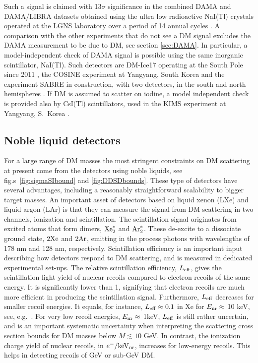 Such a signal is claimed with 13$\sigma$ significance in the combined DAMA and DAMA/LIBRA datasets obtained using the ultra low radioactive NaI(Tl) crystals operated at the LGNS laboratory over a period of 14 annual cycles \cite{DAMA,DAMA/LIBRA}. A comparison with the other experiments that do not see a DM signal excludes the DAMA measurement to be due to DM, see section \ref{sec:DAMA}.
In particular, a model-independent check of DAMA signal is possible using the same inorganic scintillator, NaI(Tl). Such detectors are DM-Ice17 operating at  the South Pole since 2011 \cite{1602.05939}, the COSINE experiment at Yangyang, South Korea  and the experiment SABRE in construction, with two detectors, in the south and north hemispheres \cite{SABRE}.
If DM is assumed to scatter on iodine, a model independent check is provided also by CsI(Tl) scintillators,  used in the KIMS experiment at Yangyang, S.\ Korea  \cite{KIMS}.


\subsection{Noble liquid detectors}

For a large range of DM masses the most stringent constraints on DM scattering  at present come from the detectors using noble liquids, see fig.s~\ref{fig:sigmaSIbound} and \ref{fig:DDSDbounds}. These type of detectors have several advantages, including a reasonably straightforward scalability to bigger target masses. An important asset of 
detectors based on liquid xenon (LXe) and liquid argon (LAr) is that they can measure the signal from DM scattering in two channels, ionization and scintillation. The scintillation signal originates from excited atoms  that form dimers, ${\rm Xe}_2^*$ and ${\rm Ar}_2^*$. These de-excite to a dissociate ground state, $2 {\rm Xe}$ and $2 {\rm Ar}$, emitting in the process photons with wavelengths of 178 nm and 128 nm, respectively. 
Scintillation efficiency is an important input describing how detectors respond to DM scattering, and is measured in dedicated experimental set-ups. The relative scintillation efficiency, $L_{\rm eff}$, gives the scintillation light yield of nuclear recoils compared to electron recoils of the same energy. It is significantly lower than 1, signifying that electron recoils are much more efficient in producing the scintillation signal. Furthermore, $L_{\rm eff}$ decreases for smaller recoil energies. It equals, for instance, $L_{\rm eff}\approx 0.1$ in  Xe for $E_{\rm nr}\approx$ 10 keV, see, e.g.~\cite{1104.2587,LUX}.  
For very low recoil energies, $E_{\rm nr}\approx$ 1keV, $L_{\rm eff}$ is still rather uncertain, and is an important systematic uncertainty when interpreting the scattering cross section bounds for DM masses below $M\lesssim 10$ GeV. In contrast, the ionization charge yield  of nuclear recoils, in $e^-/{\rm keV}_{\rm nr}$, increases for low-energy recoils. This helps in detecting recoils of GeV or sub-GeV DM. 

